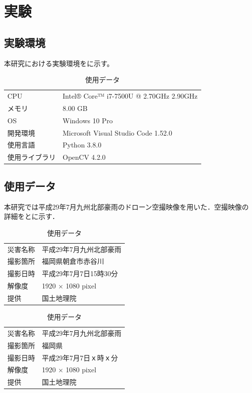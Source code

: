 \documentclass[../Thesis]{subfiles}
\begin{document}
\chapter{実験}


\section{実験環境}
本研究における実験環境をに示す。

\begin{table}[h]
  \centering
	\caption{使用データ}
	\label{tab01}
	\begin{tabular}{l l}
		\hline
		CPU & Intel® Core™ i7-7500U @ 2.70GHz 2.90GHz\\
		メモリ & 8.00 GB \\
		OS & Windows 10 Pro \\
		開発環境 & Microsoft Visual Studio Code 1.52.0 \\
		使用言語 & Python 3.8.0 \\
		使用ライブラリ & OpenCV 4.2.0 \\ \hline
	\end{tabular}
\end{table}

\section{使用データ}
本研究では平成29年7月九州北部豪雨のドローン空撮映像\cite{web02}を用いた．空撮映像の詳細をとに示す．

\begin{table}[h]
	\centering
	\caption{使用データ}
	\label{tab02}
	\begin{tabular}{l l}
		\hline
		災害名称 & 平成29年7月九州北部豪雨 \\
		撮影箇所 & 福岡県朝倉市赤谷川 \\
		撮影日時 & 平成29年7月7日15時30分 \\
		解像度 & 1920 × 1080 pixel\\
		提供 & 国土地理院 \\ \hline
	\end{tabular}
\end{table}

\begin{table}[h]
	\centering
	\caption{使用データ}
	\label{tab03}
	\begin{tabular}{l l}
		\hline
		災害名称 & 平成29年7月九州北部豪雨 \\
		撮影箇所 & 福岡県 \\
		撮影日時 & 平成29年7月7日ｘ時ｘ分 \\
		解像度 & 1920 × 1080 pixel\\
		提供 & 国土地理院 \\ \hline
	\end{tabular}
\end{table}
\end{document}
